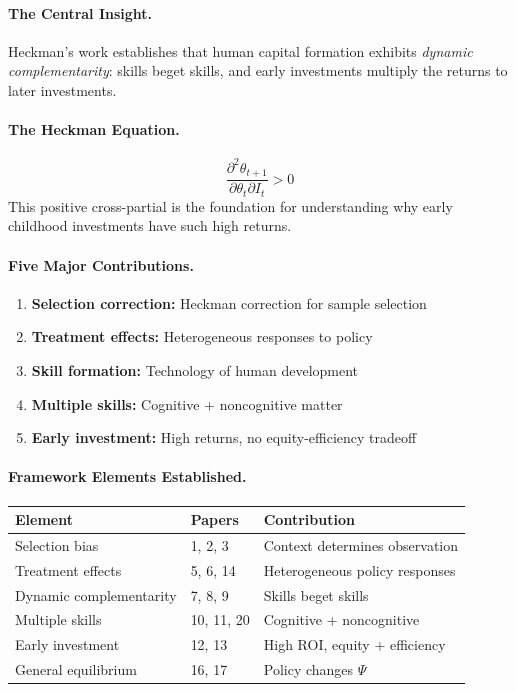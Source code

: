 \paragraph{The Central Insight.}
Heckman's work establishes that human capital formation exhibits
\emph{dynamic complementarity}: skills beget skills, and early investments
multiply the returns to later investments.

\paragraph{The Heckman Equation.}
\begin{equation}
  \frac{\partial^2 \theta_{t+1}}{\partial \theta_t \partial I_t} > 0
\end{equation}
This positive cross-partial is the foundation for understanding why
early childhood investments have such high returns.

\paragraph{Five Major Contributions.}

\begin{enumerate}
  \item \textbf{Selection correction:} Heckman correction for sample selection
  \item \textbf{Treatment effects:} Heterogeneous responses to policy
  \item \textbf{Skill formation:} Technology of human development
  \item \textbf{Multiple skills:} Cognitive + noncognitive matter
  \item \textbf{Early investment:} High returns, no equity-efficiency tradeoff
\end{enumerate}

\paragraph{Framework Elements Established.}

\begin{center}
\renewcommand{\arraystretch}{1.2}
\small
\begin{tabular}{lll}
\hline
\textbf{Element} & \textbf{Papers} & \textbf{Contribution} \\
\hline
Selection bias & 1, 2, 3 & Context determines observation \\
Treatment effects & 5, 6, 14 & Heterogeneous policy responses \\
Dynamic complementarity & 7, 8, 9 & Skills beget skills \\
Multiple skills & 10, 11, 20 & Cognitive + noncognitive \\
Early investment & 12, 13 & High ROI, equity + efficiency \\
General equilibrium & 16, 17 & Policy changes $\Psi$ \\
\hline
\end{tabular}
\end{center}

